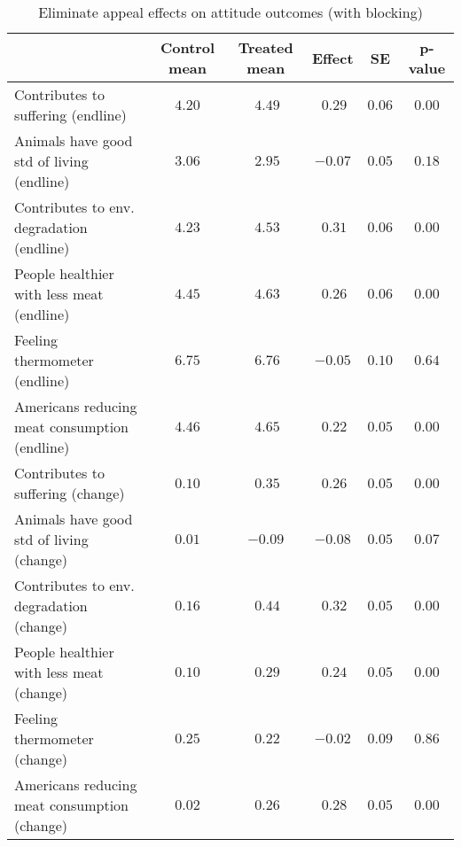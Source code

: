 \begin{table*}[ht]
\caption{Eliminate appeal effects on attitude outcomes (with blocking)\label{round}} 
\begin{center}
\begin{tabular}{lccccc}
\hline\hline
\multicolumn{1}{l}{}&\multicolumn{1}{c}{Control mean}&\multicolumn{1}{c}{Treated mean}&\multicolumn{1}{c}{Effect}&\multicolumn{1}{c}{SE}&\multicolumn{1}{c}{p-value}\tabularnewline
\hline
Contributes to suffering (endline)&$4.20$&$~4.49$&$~0.29$&$0.06$&$0.00$\tabularnewline
Animals have good std of living (endline)&$3.06$&$~2.95$&$-0.07$&$0.05$&$0.18$\tabularnewline
Contributes to env. degradation (endline)&$4.23$&$~4.53$&$~0.31$&$0.06$&$0.00$\tabularnewline
People healthier with less meat (endline)&$4.45$&$~4.63$&$~0.26$&$0.06$&$0.00$\tabularnewline
Feeling thermometer (endline)&$6.75$&$~6.76$&$-0.05$&$0.10$&$0.64$\tabularnewline
Americans reducing meat consumption (endline)&$4.46$&$~4.65$&$~0.22$&$0.05$&$0.00$\tabularnewline
Contributes to suffering (change)&$0.10$&$~0.35$&$~0.26$&$0.05$&$0.00$\tabularnewline
Animals have good std of living (change)&$0.01$&$-0.09$&$-0.08$&$0.05$&$0.07$\tabularnewline
Contributes to env. degradation (change)&$0.16$&$~0.44$&$~0.32$&$0.05$&$0.00$\tabularnewline
People healthier with less meat (change)&$0.10$&$~0.29$&$~0.24$&$0.05$&$0.00$\tabularnewline
Feeling thermometer (change)&$0.25$&$~0.22$&$-0.02$&$0.09$&$0.86$\tabularnewline
Americans reducing meat consumption (change)&$0.02$&$~0.26$&$~0.28$&$0.05$&$0.00$\tabularnewline
\hline
\end{tabular}\end{center}

\end{table*}
